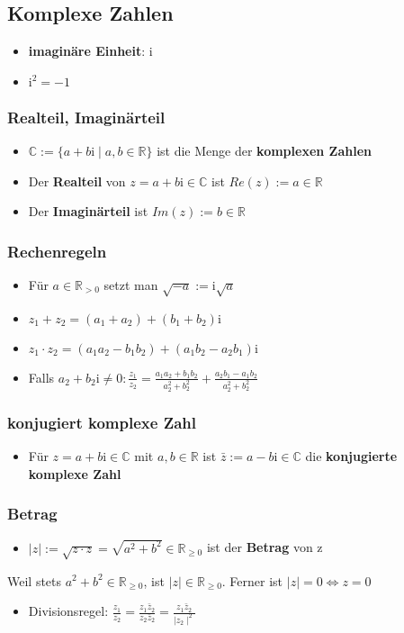 \documentclass[titlepage]{article}
\newcommand{\C}{\mathbb{C}}
\newcommand{\R}{\mathbb{R}}
\newcommand{\1}{\mathbb{1}}
\newcommand{\0}{\mathbb{0}}
\begin{document}
			\subsection{Komplexe Zahlen}
				\begin{itemize}
					\item \textbf{imaginäre Einheit}: $\mathrm{i}$
					\item $\mathrm{i}^2=-1$
				\end{itemize}
				\subsubsection{Realteil, Imaginärteil}
					\begin{itemize}
						\item $\C:=\{a+b\mathrm{i}\mid a,b\in\R\}$ ist die Menge der \textbf{komplexen Zahlen}
						\item Der \textbf{Realteil} von $z=a+b\mathrm{i}\in\C$ ist $Re(z):=a\in\R$
						\item Der \textbf{Imaginärteil} ist $Im(z):=b\in\R$
					\end{itemize}
				\subsubsection{Rechenregeln}
					\begin{itemize}
						\item Für $a\in\R_{>0}$ setzt man $\sqrt{-a}:=\mathrm{i}\sqrt{a}$
						\item $z_1+z_2=(a_1+a_2)+(b_1+b_2)\mathrm{i}$
						\item $z_1\cdot z_2=(a_1a_2-b_1b_2)+(a_1b_2-a_2b_1)\mathrm{i}$
						\item Falls $a_2+b_2\mathrm{i}\neq0:\frac{z_1}{z_2}=\frac{a_1a_2+b_1b_2}{a_2^2+b_2^2}+\frac{a_2b_1-a_1b_2}{a_2^2+b_2^2}$
					\end{itemize}
				\subsubsection{konjugiert komplexe Zahl}
					\begin{itemize}
						\item Für $z=a+b\mathrm{i}\in\C$ mit $a,b\in\R$ ist $\bar z:=a-b\mathrm{i}\in\C$ die \textbf{konjugierte komplexe Zahl}
					\end{itemize}
				\subsubsection{Betrag}
					\begin{itemize}
						\item $\mid z\mid:=\sqrt{z\cdot z}=\sqrt{a^2+b^2}\in\R_{\ge0}$ ist der \textbf{Betrag} von z\\
					\end{itemize}
					Weil stets $a^2+b^2\in\R_{\ge0}$, ist $\mid z\mid\in\R_{\ge0}$. Ferner ist $\mid z\mid=0\Longleftrightarrow z=0$
					\begin{itemize}
						\item Divisionsregel: $\frac{z_1}{z_2}=\frac{z_1\bar z_2}{z_2\bar z_2}=\frac{z_1\bar z_2}{\mid z_2\mid^2}$
					\end{itemize}
\end{document}
